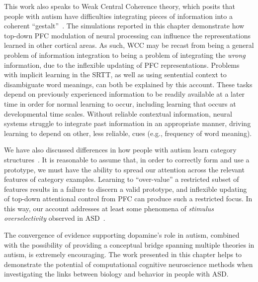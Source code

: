 This work also speaks to Weak Central Coherence theory, which posits that people with autism have difficulties integrating pieces of information into a coherent ``gestalt''~\cite{FrithU:1989:AutismWCC,HappeF:1999:WCC}. The simulations reported in this chapter demonstrate how top-down PFC modulation of neural processing can influence the representations learned in other cortical areas. As such, WCC may be recast from being a general problem of information integration to being a problem of integrating the \emph{wrong} information, due to the inflexible updating of PFC representations. Problems with implicit learning in the SRTT, as well as using sentential context to disambiguate word meanings, can both be explained by this account. These tasks depend on previously experienced information to be readily available at a later time in order for normal learning to occur, including learning that occurs at developmental time scales. Without reliable contextual information, neural systems struggle to integrate past information in an appropriate manner, driving learning to depend on other, less reliable, cues (e.g., frequency of word meaning).

We have also discussed differences in how people with autism learn category structures~\cite{KlingerLG:2001:Prototype,GastgebHZ:2009:Prototype}. It is reasonable to assume that, in order to correctly form and use a prototype, we must have the ability to spread our attention across the relevant features of category examples. Learning to ``over-value'' a restricted subset of features results in a failure to discern a valid prototype, and inflexible updating of top-down attentional control from PFC can produce such a restricted focus. In this way, our account addresses at least some phenomena of \emph{stimulus overselectivity} observed in ASD~\cite{LovaasO:1971:Selective,ReedP:2005:TaskLoad}.

The convergence of evidence supporting dopamine's role in autism, combined with the possibility of providing a conceptual bridge spanning multiple theories in autism, is extremely encouraging. The work presented in this chapter helps to demonstrate the potential of computational cognitive neuroscience methods when investigating the links between biology and behavior in people with ASD.
